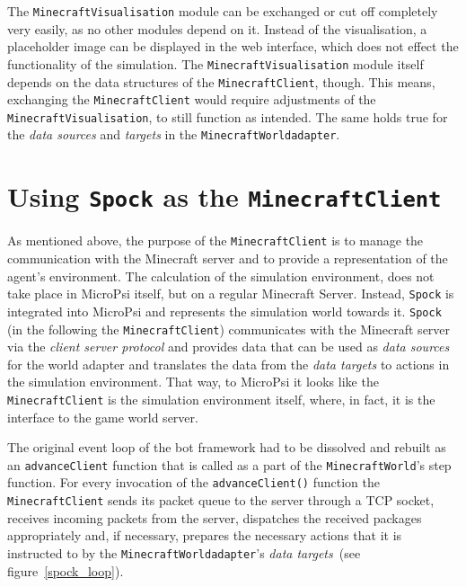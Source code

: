 The \texttt{MinecraftVisualisation} module can be exchanged or cut off completely very easily, as no other modules depend on it. Instead of the visualisation, a placeholder image can be displayed in the web interface, which does not effect the functionality of the simulation. The \texttt{MinecraftVisualisation} module itself depends on the data structures of the \texttt{MinecraftClient}, though. This means, exchanging the \texttt{MinecraftClient} would require adjustments of the \texttt{MinecraftVisualisation}, to still function as intended. The same holds true for the \emph{data sources} and \emph{targets} in the \texttt{MinecraftWorldadapter}.

    \section{Using \texttt{Spock} as the \texttt{MinecraftClient}}

As mentioned above, the purpose of the \texttt{MinecraftClient} is to manage the communication with the Minecraft server and to provide a representation of the agent's environment. The calculation of the simulation environment, does not take place in MicroPsi itself, but on a regular Minecraft Server. Instead, \texttt{Spock} is integrated into MicroPsi and represents the simulation world towards it. \texttt{Spock} (in the following the \texttt{MinecraftClient}) communicates with the Minecraft server via the \emph{client server protocol} and provides data that can be used as \emph{data sources} for the world adapter and translates the data from the \emph{data targets} to actions in the simulation environment. That way, to MicroPsi it looks like the \texttt{MinecraftClient} is the simulation environment itself, where, in fact, it is the interface to the game world server.


The original event loop of the bot framework had to be dissolved and rebuilt as an \texttt{advanceClient} function that is called as a part of the \texttt{MinecraftWorld}'s step function. For every invocation of the \texttt{advanceClient()} function the \texttt{MinecraftClient} sends its packet queue to the server through a TCP socket, receives incoming packets from the server, dispatches the received packages appropriately and, if necessary, prepares the necessary actions that it is instructed to by the \texttt{MinecraftWorldadapter}'s \emph{data targets}~(see figure~\ref{spock_loop}).

